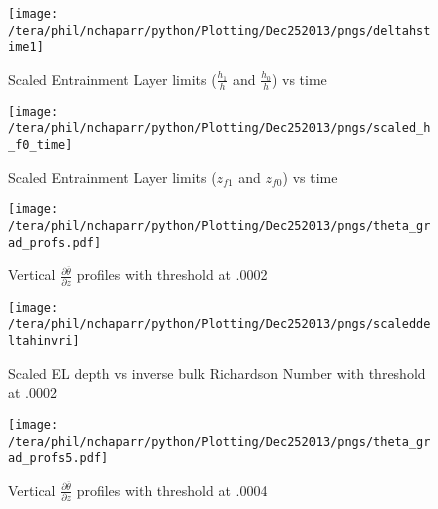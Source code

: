 \begin{figure}[htbp]
    \centering
    \texttt{[image: /tera/phil/nchaparr/python/Plotting/Dec252013/pngs/deltahstime1]}
    \caption{Scaled Entrainment Layer limits ($\frac{h_{1}}{h}$ and $\frac{h_{0}}{h}$) vs time}
    \label{fig:scaledELlims}   %
\end{figure}

\begin{figure}[htbp]
    \centering
    \texttt{[image: /tera/phil/nchaparr/python/Plotting/Dec252013/pngs/scaled\_h\_f0\_time]}
    \caption{Scaled Entrainment Layer limits ($z_{f1}$ and $z_{f0}$) vs time}
    \label{fig:scaledELlims1}   %
\end{figure}

\begin{figure}[htbp]
    \centering
    \texttt{[image: /tera/phil/nchaparr/python/Plotting/Dec252013/pngs/theta\_grad\_profs.pdf]}
    \caption{Vertical $\frac{\partial \overline{\theta}}{\partial z}$ profiles with threshold at .0002}
    \label{fig:thresh}   %
\end{figure}

\begin{figure}[htbp]
\centering
 \texttt{[image: /tera/phil/nchaparr/python/Plotting/Dec252013/pngs/scaleddeltahinvri]}
       
        \caption{Scaled EL depth vs inverse bulk Richardson Number with threshold at .0002}
         \label{fig:scaledeltahinvri}
\end{figure}

\begin{figure}[htbp]
    \centering
    \texttt{[image: /tera/phil/nchaparr/python/Plotting/Dec252013/pngs/theta\_grad\_profs5.pdf]}
    \caption{Vertical $\frac{\partial \overline{\theta}}{\partial z}$ profiles with threshold at .0004}
    \label{fig:thresh1}   %
\end{figure}

